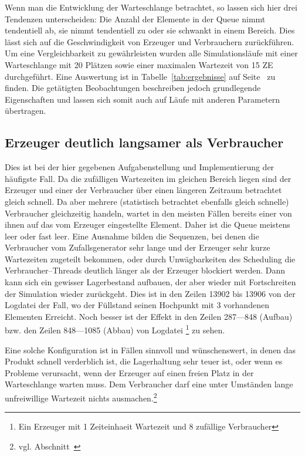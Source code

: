 Wenn man die Entwicklung der Warteschlange betrachtet, so lassen sich hier drei Tendenzen unterscheiden: Die Anzahl der Elemente in der Queue nimmt tendentiell ab, sie nimmt tendentiell zu oder sie schwankt in einem Bereich. Dies lässt sich auf die Geschwindigkeit von Erzeuger und Verbrauchern zurückführen. Um eine Vergleichbarkeit zu gewährleisten wurden alle Simulationsläufe mit einer Warteschlange mit 20 Plätzen sowie einer maximalen Wartezeit von 15 \ac{ZE} durchgeführt. Eine Auswertung ist in Tabelle~\ref{tab:ergebnisse} auf Seite~\pageref{tab:ergebnisse} zu finden. Die getätigten Beobachtungen beschreiben jedoch grundlegende Eigenschaften und lassen sich somit auch auf Läufe mit anderen Parametern übertragen.

\subsection{Erzeuger deutlich langsamer als Verbraucher} %
\label{sub:erzeuger_langsamer_als_verbraucher}
Dies ist bei der hier gegebenen Aufgabenstellung und Implementierung der häufigste Fall. Da die zufälligen Wartezeiten im gleichen Bereich liegen sind der Erzeuger und einer der Verbraucher über einen längeren Zeitraum betrachtet gleich schnell. Da aber mehrere (statistisch betrachtet ebenfalls gleich schnelle) Verbraucher gleichzeitig handeln, wartet in den meisten Fällen bereits einer von ihnen auf das vom Erzeuger eingestellte Element. Daher ist die Queue meistens leer oder fast leer. Eine Ausnahme bilden die Sequenzen, bei denen die Verbraucher vom Zufallsgenerator sehr lange und der Erzeuger sehr kurze Wartezeiten zugeteilt bekommen, oder durch Unwägbarkeiten des Scheduling die Verbraucher–Threads deutlich länger als der Erzeuger blockiert werden. Dann kann sich ein gewisser Lagerbestand aufbauen, der aber wieder mit Fortschreiten der Simulation wieder zurückgeht. Dies ist in den Zeilen 13902 bis 13906 von der Logdatei  der Fall, wo der Füllstand seinen Hochpunkt mit 3 vorhandenen Elementen Erreicht. Noch besser ist der Effekt in den Zeilen 287—848 (Aufbau) bzw. den Zeilen 848—1085 (Abbau) von Logdatei \footnote{Ein Erzeuger mit 1 Zeiteinhaeit Wartezeit und 8 zufällige Verbraucher} zu sehen.

Eine solche Konfiguration ist in Fällen sinnvoll und wünschenswert, in denen das Produkt schnell verderblich ist, die Lagerhaltung sehr teuer ist, oder wenn es Probleme verursacht, wenn der Erzeuger auf einen freien Platz in der Warteschlange warten muss. Dem Verbraucher darf eine unter Umständen lange unfreiwillige Wartezeit nichts ausmachen.\footnote{vgl. Abschnitt~}


